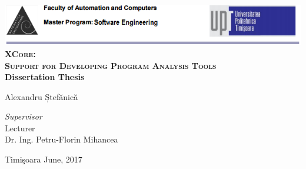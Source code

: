 \begin{titlepage}
	\begin{center}	
		\includegraphics[width=\textwidth]{../img/header.png}\\[4cm]
		
		{\huge \bfseries \textsc{XCore:\vspace{2.5mm}\\ Support for 
Developing Program\vspace{2.5mm} Analysis Tools}}
		\\[3cm]
		
		{\bfseries Dissertation Thesis} \\[3cm]
								
		\begin{flushright}
				\large Alexandru Ștefănică \\[1cm]
		\end{flushright}
		\begin{flushleft}
			 \large
				\emph{Supervisor} \\
				 Lecturer\\
				Dr. Ing. Petru-Florin Mihancea \\[1cm]
		\end{flushleft}
		
		{\large {Timi\c{s}oara June, 2017}}
	\end{center}
\end{titlepage}
